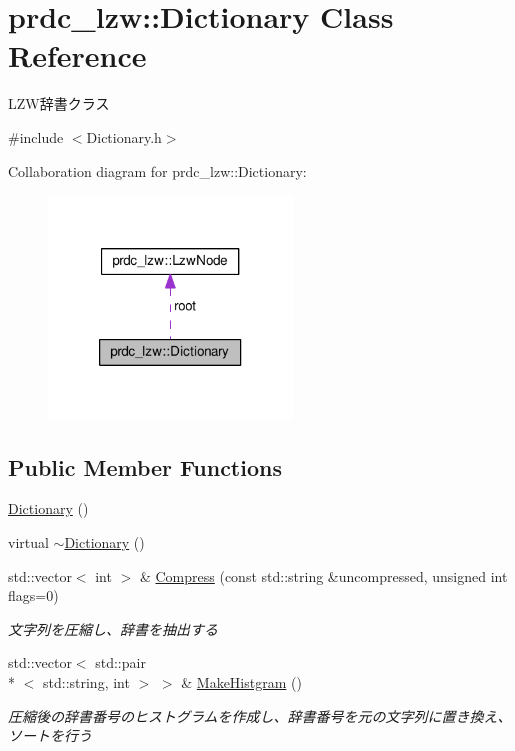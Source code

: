 \hypertarget{classprdc__lzw_1_1Dictionary}{\section{prdc\-\_\-lzw\-:\-:Dictionary Class Reference}
\label{classprdc__lzw_1_1Dictionary}
}


L\-Z\-W辞書クラス  




{\ttfamily \#include $<$Dictionary.\-h$>$}



Collaboration diagram for prdc\-\_\-lzw\-:\-:Dictionary\-:\nopagebreak
\begin{figure}[H]
\begin{center}
\leavevmode
\includegraphics[width=184pt]{classprdc__lzw_1_1Dictionary__coll__graph}
\end{center}
\end{figure}
\subsection*{Public Member Functions}
\begin{DoxyCompactItemize}
\item 
\hyperlink{classprdc__lzw_1_1Dictionary_a7a53efd7967e59748f321938aa983368}{Dictionary} ()
\item 
virtual \hyperlink{classprdc__lzw_1_1Dictionary_a953fce0e9128a8e48b62779fdefcc051}{$\sim$\-Dictionary} ()
\item 
std\-::vector$<$ int $>$ \& \hyperlink{classprdc__lzw_1_1Dictionary_afcdd828822905288df0f7e1015671c3f}{Compress} (const std\-::string \&uncompressed, unsigned int flags=0)
\begin{DoxyCompactList}\small\item\em 文字列を圧縮し、辞書を抽出する \end{DoxyCompactList}\item 
std\-::vector$<$ std\-::pair\\*
$<$ std\-::string, int $>$ $>$ \& \hyperlink{classprdc__lzw_1_1Dictionary_a29102f3ebd6a703f1775e65e3af6aeb0}{Make\-Histgram} ()
\begin{DoxyCompactList}\small\item\em 圧縮後の辞書番号のヒストグラムを作成し、辞書番号を元の文字列に置き換え、ソートを行う \end{DoxyCompactList}\end{DoxyCompactItemize}
